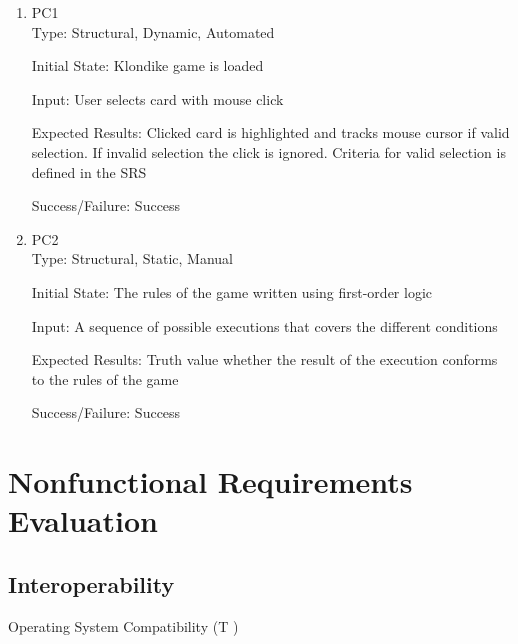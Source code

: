 \documentclass[12pt, titlepage]{article}
\newcounter{tnum}
\newcommand{\tthetnum}{T\thetnum}
\begin{document}
	\begin{enumerate}
		\item{PC1\\}
		Type: Structural, Dynamic, Automated
		
		Initial State: Klondike game is loaded
		
		Input: User selects card with mouse click
		
		Expected Results: Clicked card is highlighted and tracks mouse cursor if valid 
		selection. If invalid selection the click is ignored. Criteria for valid 
		selection is defined in the SRS

		Success/Failure: Success

		\item{PC2\\}
		Type: Structural, Static, Manual
		
		Initial State: The rules of the game written using first-order logic
		
		Input: A sequence of possible executions that covers the different conditions
		
		Expected Results: Truth value whether the result of the execution conforms to the rules
		of the game

		Success/Failure: Success
	\end{enumerate} 



\section{Nonfunctional Requirements Evaluation}

\subsection{Interoperability}

	\begin{description}
		\item[Operating System Compatibility (\tthetnum 
		\label{tOS})]
	\end{description}
	
\end{document}
